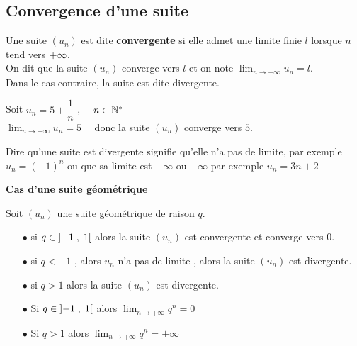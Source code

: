 \subsection{Convergence d'une suite}
 \begin{definition}
 Une suite $(u_{n})$  est dite  \textbf{convergente} si elle admet une limite finie $ l $ lorsque $ n $ tend vers  $ +\infty $. \\
  On dit  que la suite $(u_{n})$  converge vers $ l $  et on note $  \lim_{n \to  +\infty} u_{n}=l$.\\
  Dans le cas contraire, la suite est dite divergente.
  \end{definition}
\begin{example}

 Soit $ u_{n}=5+\dfrac{1}{n} $ ,  $ \quad n\in\mathbb{N}^* $ \\
 $ \displaystyle \lim_{n \to  +\infty} u_{n}=5\quad$  donc la suite $(u_{n})$  converge vers $ 5 $.
 \end{example}
 \begin{remark} 
 
 
  Dire qu'une suite est divergente  signifie qu'elle n'a pas de limite, par exemple $ u_{n}=(-1)^{n} $ ou que sa limite est $+\infty $ ou $-\infty $ par exemple $ u_{n}=3n+2 $
 \end{remark}
 \textbf{Cas d'une suite géométrique} 
 \begin{property}
 Soit $(u_{n})$ une suite géométrique de raison $ q $.
 \begin{itemize}
 \item[$  \bullet$] si $ q\in\left]-1 \;,\; 1\right[ $ alors la suite $(u_{n})$ est convergente et converge vers $ 0 $.
 \item[$  \bullet$] si $ q< -1  $ , alors $u_{n}$ n'a pas de limite ,  alors la suite $(u_{n})$ est divergente.
 \item[$  \bullet$] si $ q >1  $  alors la suite $(u_{n})$ est divergente.

 \end{itemize}
  \end{property}
 
 \medskip
 \begin{corollary}
 \begin{itemize}
 \item[$  \bullet$] Si $ q\in\left]-1 \;,\; 1\right[ $ alors $ \displaystyle \lim_{n \to  +\infty} q^{n}= 0 $
 \item[$  \bullet$] Si $ q>1 $  alors $ \displaystyle \lim_{n \to  +\infty} q^{n}= +\infty $
  \end{itemize}
 
 \end{corollary}

